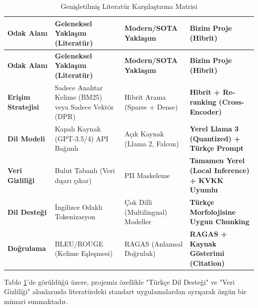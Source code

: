 \documentclass[12pt,a4paper]{report}
\begin{document}
\begin{longtable}{|p{3cm}|p{4cm}|p{4cm}|p{3.5cm}|}
\caption{Genişletilmiş Literatür Karşılaştırma Matrisi} \label{tab:lit_matrix} \\
\hline
\textbf{Odak Alanı} & \textbf{Geleneksel Yaklaşım (Literatür)} & \textbf{Modern/SOTA Yaklaşım} & \textbf{Bizim Proje (Hibrit)} \\
\hline
\endfirsthead
\hline
\textbf{Odak Alanı} & \textbf{Geleneksel Yaklaşım (Literatür)} & \textbf{Modern/SOTA Yaklaşım} & \textbf{Bizim Proje (Hibrit)} \\
\hline
\endhead

\textbf{Erişim Stratejisi} & Sadece Anahtar Kelime (BM25) veya Sadece Vektör (DPR) \cite{karpukhin2020dense} & Hibrit Arama (Sparse + Dense) & \textbf{Hibrit + Re-ranking (Cross-Encoder) \cite{nogueira2019passage}} \\
\hline
\textbf{Dil Modeli} & Kapalı Kaynak (GPT-3.5/4) API Bağımlı \cite{brown2020language} & Açık Kaynak (Llama 2, Falcon) & \textbf{Yerel Llama 3 (Quantized) + Türkçe Prompt} \cite{dubey2024llama} \\
\hline
\textbf{Veri Gizliliği} & Bulut Tabanlı (Veri dışarı çıkar) & PII Maskeleme & \textbf{Tamamen Yerel (Local Inference) + KVKK Uyumlu \cite{touvron2023llama}} \\
\hline
\textbf{Dil Desteği} & İngilizce Odaklı Tokenizasyon & Çok Dilli (Multilingual) Modeller & \textbf{Türkçe Morfolojisine Uygun Chunking \cite{coltekin2022turkish}} \\
\hline
\textbf{Doğrulama} & BLEU/ROUGE (Kelime Eşleşmesi) \cite{lin2004rouge} & RAGAS (Anlamsal Doğruluk) & \textbf{RAGAS + Kaynak Gösterimi (Citation)} \\
\hline
\end{longtable}

Tablo \ref{tab:lit_matrix}'de görüldüğü üzere, projemiz özellikle "Türkçe Dil Desteği" ve "Veri Gizliliği" alanlarında literatürdeki standart uygulamalardan ayrışarak özgün bir mimari sunmaktadır.
\end{document}
